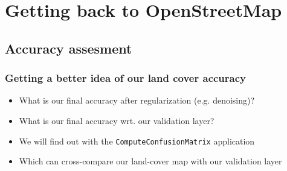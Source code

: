 \documentclass[8pt]{beamer}
\begin{document}
\section{Getting back to OpenStreetMap}

\subsection{Accuracy assesment}

\begin{frame}
\frametitle{Getting a better idea of our land cover accuracy}

\begin{itemize}
\item What is our final accuracy after regularization (e.g. denoising)?
\item What is our final accuracy wrt. our validation layer?
\item We will find out with the \texttt{ComputeConfusionMatrix} application
\item Which can cross-compare our land-cover map with our validation layer
\end{itemize}

\end{frame}
\end{document}
